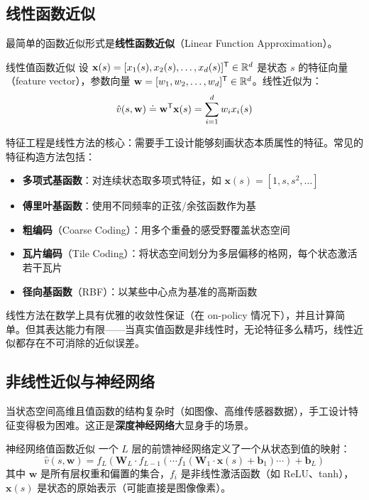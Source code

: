 \subsection{线性函数近似}

最简单的函数近似形式是\textbf{线性函数近似}（Linear Function Approximation）。

\begin{mydefinition}{线性值函数近似}
设 $\mathbf{x}(s) = [x_1(s), x_2(s), \ldots, x_d(s)]^{\mathsf{T}} \in \mathbb{R}^d$ 是状态 $s$ 的特征向量（feature vector），参数向量 $\mathbf{w} = [w_1, w_2, \ldots, w_d]^{\mathsf{T}} \in \mathbb{R}^d$。线性近似为：
$$\hat{v}(s, \mathbf{w}) \doteq \mathbf{w}^{\mathsf{T}} \mathbf{x}(s) = \sum_{i=1}^{d} w_i x_i(s)$$
\end{mydefinition}

特征工程是线性方法的核心：需要手工设计能够刻画状态本质属性的特征。常见的特征构造方法包括：
\begin{itemize}
    \item \textbf{多项式基函数}：对连续状态取多项式特征，如 $\mathbf{x}(s) = [1, s, s^2, \ldots]$
    \item \textbf{傅里叶基函数}：使用不同频率的正弦/余弦函数作为基
    \item \textbf{粗编码}（Coarse Coding）：用多个重叠的感受野覆盖状态空间
    \item \textbf{瓦片编码}（Tile Coding）：将状态空间划分为多层偏移的格网，每个状态激活若干瓦片
    \item \textbf{径向基函数}（RBF）：以某些中心点为基准的高斯函数
\end{itemize}

\begin{remark}
线性方法在数学上具有优雅的收敛性保证（在 on-policy 情况下），并且计算简单。但其表达能力有限——当真实值函数是非线性时，无论特征多么精巧，线性近似都存在不可消除的近似误差。
\end{remark}

\subsection{非线性近似与神经网络}

当状态空间高维且值函数的结构复杂时（如图像、高维传感器数据），手工设计特征变得极为困难。这正是\textbf{深度神经网络}大显身手的场景。

\begin{mydefinition}{神经网络值函数近似}
一个 $L$ 层的前馈神经网络定义了一个从状态到值的映射：
$$\hat{v}(s, \mathbf{w}) = f_L(\mathbf{W}_L \cdot f_{L-1}(\cdots f_1(\mathbf{W}_1 \cdot \mathbf{x}(s) + \mathbf{b}_1) \cdots) + \mathbf{b}_L)$$
其中 $\mathbf{w}$ 是所有层权重和偏置的集合，$f_i$ 是非线性激活函数（如 ReLU、tanh），$\mathbf{x}(s)$ 是状态的原始表示（可能直接是图像像素）。
\end{mydefinition}


